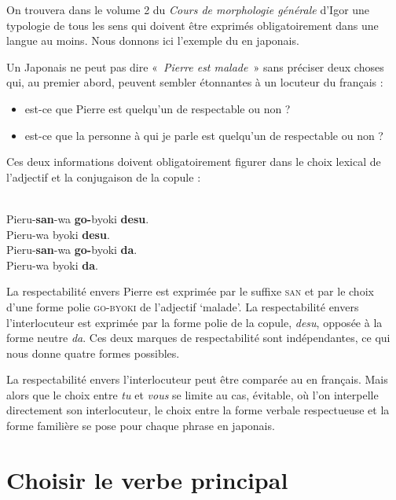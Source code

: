 {    On trouvera dans le volume 2 du \textit{Cours de morphologie générale} d’Igor \citet{melcuk1993cours} une typologie de tous les sens qui doivent être exprimés obligatoirement dans une langue au moins. Nous donnons ici l’exemple du  en japonais.

    Un Japonais ne peut pas dire «~\textit{Pierre est malade~}» sans préciser deux choses qui, au premier abord, peuvent sembler étonnantes à un locuteur du français :

    \begin{itemize}
    \item  est-ce que Pierre est quelqu’un de respectable ou non ?
    \item  est-ce que la personne à qui je parle est quelqu’un de respectable ou non ?
    \end{itemize}

    Ces deux informations doivent obligatoirement figurer dans le choix lexical de l’adjectif et la conjugaison de la copule :

    \ea
    \\Pieru-\textbf{san}{}-wa \textbf{go-}byoki \textbf{desu}.
    \\Pieru-wa byoki \textbf{desu}.
    \\Pieru-\textbf{san}{}-wa \textbf{go-}byoki \textbf{da}.
    \\Pieru-wa byoki \textbf{da}.
    \z
    \z

    La respectabilité envers Pierre est exprimée par le suffixe \textsc{san} et par le choix d’une forme polie \textsc{go-byoki} de l’adjectif ‘malade’. La respectabilité envers l’interlocuteur est exprimée par la forme polie de la copule, \textit{desu}, opposée à la forme neutre \textit{da}. Ces deux marques de respectabilité sont indépendantes, ce qui nous donne quatre formes possibles.

    La respectabilité envers l’interlocuteur peut être comparée au  en français. Mais alors que le choix entre \textit{tu} et \textit{vous} se limite au cas, évitable, où l’on interpelle directement son interlocuteur, le choix entre la forme verbale respectueuse et la forme familière se pose pour chaque phrase en japonais.
}
\section{Choisir le verbe principal}\label{sec:1.2.13}

